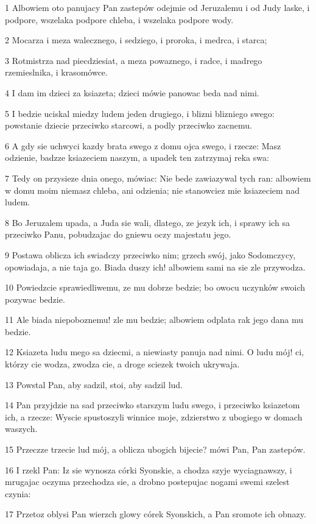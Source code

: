 \par 1 Albowiem oto panujacy Pan zastepów odejmie od Jeruzalemu i od Judy laske, i podpore, wszelaka podpore chleba, i wszelaka podpore wody.
\par 2 Mocarza i meza walecznego, i sedziego, i proroka, i medrca, i starca;
\par 3 Rotmistrza nad piecdziesiat, a meza powaznego, i radce, i madrego rzemieslnika, i krasomówce.
\par 4 I dam im dzieci za ksiazeta; dzieci mówie panowac beda nad nimi.
\par 5 I bedzie uciskal miedzy ludem jeden drugiego, i blizni blizniego swego: powstanie dziecie przeciwko starcowi, a podly przeciwko zacnemu.
\par 6 A gdy sie uchwyci kazdy brata swego z domu ojca swego, i rzecze: Masz odzienie, badzze ksiazeciem naszym, a upadek ten zatrzymaj reka swa:
\par 7 Tedy on przysieze dnia onego, mówiac: Nie bede zawiazywal tych ran: albowiem w domu moim niemasz chleba, ani odzienia; nie stanowciez mie ksiazeciem nad ludem.
\par 8 Bo Jeruzalem upada, a Juda sie wali, dlatego, ze jezyk ich, i sprawy ich sa przeciwko Panu, pobudzajac do gniewu oczy majestatu jego.
\par 9 Postawa oblicza ich swiadczy przeciwko nim; grzech swój, jako Sodomczycy, opowiadaja, a nie taja go. Biada duszy ich! albowiem sami na sie zle przywodza.
\par 10 Powiedzcie sprawiedliwemu, ze mu dobrze bedzie; bo owocu uczynków swoich pozywac bedzie.
\par 11 Ale biada niepoboznemu! zle mu bedzie; albowiem odplata rak jego dana mu bedzie.
\par 12 Ksiazeta ludu mego sa dziecmi, a niewiasty panuja nad nimi. O ludu mój! ci, którzy cie wodza, zwodza cie, a droge sciezek twoich ukrywaja.
\par 13 Powstal Pan, aby sadzil, stoi, aby sadzil lud.
\par 14 Pan przyjdzie na sad przeciwko starszym ludu swego, i przeciwko ksiazetom ich, a rzecze: Wyscie spustoszyli winnice moje, zdzierstwo z ubogiego w domach waszych.
\par 15 Przeczze trzecie lud mój, a oblicza ubogich bijecie? mówi Pan, Pan zastepów.
\par 16 I rzekl Pan: Iz sie wynosza córki Syonskie, a chodza szyje wyciagnawszy, i mrugajac oczyma przechodza sie, a drobno postepujac nogami swemi szelest czynia:
\par 17 Przetoz oblysi Pan wierzch glowy córek Syonskich, a Pan sromote ich obnazy.
